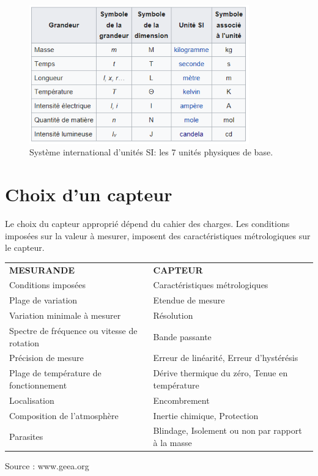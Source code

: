 \begin{figure}[h!]
\centering
\includegraphics[height=6cm]{assets/figures/4_1_2_Systeme_international_d_unites_SI.PNG}
\caption{Système international d'unités SI: les 7 unités physiques de base.}
\label{fig:Systeme_international_d_unites_SI}
\end{figure}

\section{Choix d'un capteur}

Le choix du capteur approprié dépend du cahier des charges. Les conditions imposées sur la valeur à mesurer, imposent des caractéristiques métrologiques sur le capteur.
\begin {center}
\begin{tabular}{|p{6cm}|p{6cm}|}\hline
\textbf{MESURANDE} & \textbf{CAPTEUR} \\
Conditions imposées & Caractéristiques métrologiques \\\hline\hline
Plage de variation &	Etendue de mesure \\\hline
Variation minimale à mesurer & Résolution \\\hline
Spectre de fréquence ou vitesse de rotation  & Bande passante \\\hline
Précision de mesure	& Erreur de linéarité, Erreur d'hystérésis \\\hline
Plage de température de fonctionnement &	Dérive thermique du zéro, Tenue en température \\\hline
Localisation &	Encombrement \\\hline
Composition de l'atmosphère	 & Inertie chimique, Protection \\\hline
Parasites &	Blindage, Isolement ou non par rapport à la masse \\\hline
\end{tabular}
\end{center}
Source : www.geea.org

